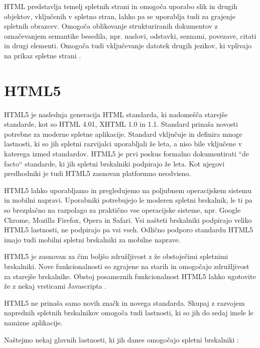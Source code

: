 \documentclass[a4paper, 12pt]{book}
\begin{document}
HTML predstavlja temelj spletnih strani in omogo\v ca uporabo slik in drugih objektov, vklju\v cenih v spletno stran, lahko pa se uporablja tudi za grajenje spletnih obrazcev. Omogo\v ca oblikovanje strukturiranih dokumentov z ozna\v cevanjem semantike besedila, npr. naslovi, odstavki, seznami, povezave, citati in drugi elementi. Omogo\v ca tudi vklju\v cevanje datotek drugih jezikov, ki vplivajo na prikaz spletne strani
\cite{wikipedia-html}.

\section{HTML5}
HTML5 je naslednja generacija HTML standarda, ki nadome\v s\v ca starej\v se standarde, kot so HTML 4.01, XHTML 1.0 in 1.1. Standard prina\v sa novosti potrebne za moderne spletne aplikacije. Standard vklju\v cuje in definira mnoge lastnosti, ki so jih spletni razvijalci uporabljali \v ze leta, a niso bile vklju\v cene v katerega izmed standardov. HTML5 je prvi poskus formalno dokumentirati ``de facto`` standarde, ki jih spletni brskalniki podpirajo \v ze leta. Kot njegovi predhodniki je tudi HTML5 zasnovan platformno neodvisno.

HTML5 lahko uporabljamo in pregledujemo na poljubnem operacijskem sistemu in mobilni napravi. Uporabniki potrebujejo le moderen spletni brskalnik, le ti pa so brezpla\v cno na razpolago za prakti\v cno vse operacijske sisteme, npr. Google Chrome, Mozilla Firefox, Opera in Safari. Vsi na\v steti brskalniki podpirajo veliko HTML5 lastnosti, ne podpirajo pa vsi vseh. Odli\v cno podporo standardu HTML5 imajo tudi mobilni spletni brskalniki za mobilne naprave.

HTML5 je zasnovan za \v cim bolj\v so zdru\v zljivost z \v ze obstoje\v cimi spletnimi
brskalniki. Nove funkcionalnosti so zgrajene na starih in omogo\v cajo zdru\v zljivost
za starej\v se brskalnike. Obstoj posameznih funkcionalnost
HTML5 lahko ugotovite \v ze z nekaj vrsticami Javascripta \cite{html5}.

HTML5 ne prina\v sa samo novih zna\v ck in novega standarda. Skupaj z razvojem naprednih spletnih brskalnikov omogo\v ca tudi lastnosti, ki so jih do sedaj imele le namizne aplikacije.

\newpage
Na\v stejmo nekaj glavnih lastnosti, ki jih danes omogo\v cajo spletni brskalniki
\cite{html5rocks}:
\end{document}
